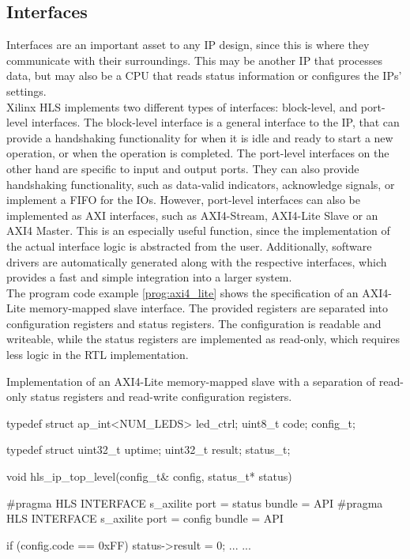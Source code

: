 \subsection{Interfaces}
\label{sec:hls:coding:interfaces}

Interfaces are an important asset to any IP design, since this is where they communicate with their surroundings.
This may be another IP that processes data, but may also be a CPU that reads status information or configures the IPs' settings.\\

Xilinx HLS implements two different types of interfaces: block-level, and port-level interfaces.
The block-level interface is a general interface to the IP, that can provide a handshaking functionality for when it is idle and ready to start a new operation, or when the operation is completed.
The port-level interfaces on the other hand are specific to input and output ports.
They can also provide handshaking functionality, such as data-valid indicators, acknowledge signals, or implement a FIFO for the IOs.
However, port-level interfaces can also be implemented as AXI interfaces, such as AXI4-Stream, AXI4-Lite Slave or an AXI4 Master.
This is an especially useful function, since the implementation of the actual interface logic is abstracted from the user.
Additionally, software drivers are automatically generated along with the respective interfaces, which provides a fast and simple integration into a larger system.\\

The program code example \ref{prog:axi4_lite} shows the specification of an AXI4-Lite memory-mapped slave interface.
The provided registers are separated into configuration registers and status registers.
The configuration is readable and writeable, while the status registers are implemented as read-only, which requires less logic in the RTL implementation.\\

\begin{program}
  \caption{Implementation of an AXI4-Lite memory-mapped slave with a separation of read-only status registers and read-write configuration registers.}
  \label{prog:axi4_lite}
\begin{CppCode}
 typedef struct {
   ap_int<NUM_LEDS> led_ctrl;
   uint8_t code;
 } config_t;

 typedef struct {
   uint32_t uptime;
   uint32_t result;
 } status_t;

 void hls_ip_top_level(config_t& config,
                       status_t* status) {
     #pragma HLS INTERFACE s_axilite port = status bundle = API
     #pragma HLS INTERFACE s_axilite port = config bundle = API

     if (config.code == 0xFF) {
       status->result = 0;
       ...
     }
     ...
 }
\end{CppCode}
\end{program}


